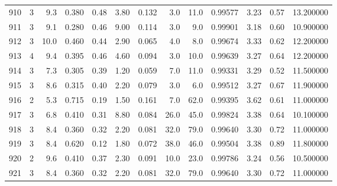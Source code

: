 \begin{tabular}{lrrrrrrrrrrrr}
910  &        3 &            9.3 &             0.380 &         0.48 &            3.80 &      0.132 &                  3.0 &                  11.0 &  0.99577 &  3.23 &       0.57 &  13.200000 \\
911  &        3 &            9.1 &             0.280 &         0.46 &            9.00 &      0.114 &                  3.0 &                   9.0 &  0.99901 &  3.18 &       0.60 &  10.900000 \\
912  &        3 &           10.0 &             0.460 &         0.44 &            2.90 &      0.065 &                  4.0 &                   8.0 &  0.99674 &  3.33 &       0.62 &  12.200000 \\
913  &        4 &            9.4 &             0.395 &         0.46 &            4.60 &      0.094 &                  3.0 &                  10.0 &  0.99639 &  3.27 &       0.64 &  12.200000 \\
914  &        3 &            7.3 &             0.305 &         0.39 &            1.20 &      0.059 &                  7.0 &                  11.0 &  0.99331 &  3.29 &       0.52 &  11.500000 \\
915  &        3 &            8.6 &             0.315 &         0.40 &            2.20 &      0.079 &                  3.0 &                   6.0 &  0.99512 &  3.27 &       0.67 &  11.900000 \\
916  &        2 &            5.3 &             0.715 &         0.19 &            1.50 &      0.161 &                  7.0 &                  62.0 &  0.99395 &  3.62 &       0.61 &  11.000000 \\
917  &        3 &            6.8 &             0.410 &         0.31 &            8.80 &      0.084 &                 26.0 &                  45.0 &  0.99824 &  3.38 &       0.64 &  10.100000 \\
918  &        3 &            8.4 &             0.360 &         0.32 &            2.20 &      0.081 &                 32.0 &                  79.0 &  0.99640 &  3.30 &       0.72 &  11.000000 \\
919  &        3 &            8.4 &             0.620 &         0.12 &            1.80 &      0.072 &                 38.0 &                  46.0 &  0.99504 &  3.38 &       0.89 &  11.800000 \\
920  &        2 &            9.6 &             0.410 &         0.37 &            2.30 &      0.091 &                 10.0 &                  23.0 &  0.99786 &  3.24 &       0.56 &  10.500000 \\
921  &        3 &            8.4 &             0.360 &         0.32 &            2.20 &      0.081 &                 32.0 &                  79.0 &  0.99640 &  3.30 &       0.72 &  11.000000 \\

\end{tabular}
